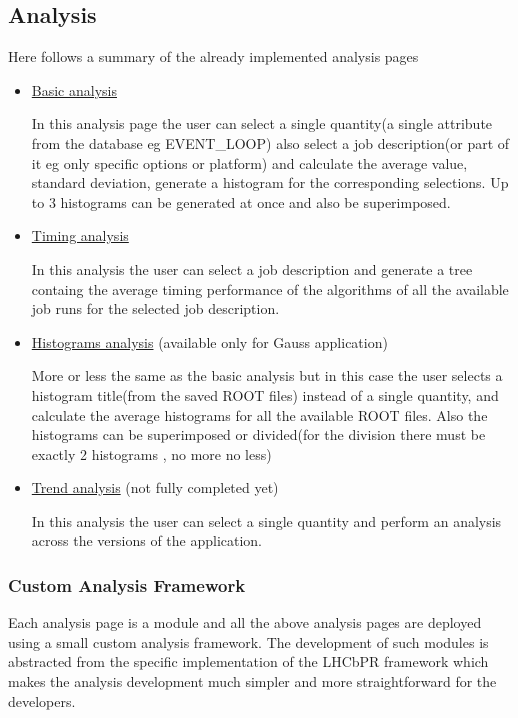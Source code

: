 \documentclass{lhcbnote}
\begin{document}
\subsection{Analysis}
Here follows a summary of the already implemented analysis pages

\begin{itemize}
\item
\underline{Basic analysis}

In this analysis page the user can select a single quantity(a single attribute from the database eg EVENT\_LOOP) 
also select a job description(or part of it eg only specific options or platform)
and calculate the average value, standard deviation, generate a histogram for the corresponding selections. Up to 3 histograms can be generated at once 
and also be superimposed.

\item
\underline{Timing analysis} 

In this analysis the user can select a job description and generate a tree containg the average timing performance of the algorithms 
of all the available job runs for the selected job description.

\item
\underline{Histograms analysis} (available only for Gauss application) 

More or less the same as the basic analysis but in this case the user selects a histogram title(from the saved ROOT files) instead of a single quantity, 
and calculate the average histograms for all the available ROOT files. 
Also the histograms can be superimposed or divided(for the division there must be exactly 2 histograms , no more no less) 

\item
\underline{Trend analysis} (not fully completed yet) 

In this analysis the user can select a single quantity and perform an analysis across the versions of the application.
\end{itemize}

\subsubsection{Custom Analysis Framework}

Each analysis page is a module and all the above analysis pages are deployed using a small custom analysis framework. 
The development of such modules is abstracted from the specific implementation of the LHCbPR framework which makes the analysis development much 
simpler and more straightforward for the developers.
\end{document}
